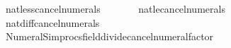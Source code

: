 \begin{isabellebody}
\ \ \ \ \ \ \ \isactrlsimproc {\isasymopen}natless{\isacharunderscore}{\kern0pt}cancel{\isacharunderscore}{\kern0pt}numerals{\isasymclose}{\isacharcomma}{\kern0pt}\isanewline
\ \ \ \ \ \ \ \isactrlsimproc {\isasymopen}natle{\isacharunderscore}{\kern0pt}cancel{\isacharunderscore}{\kern0pt}numerals{\isasymclose}{\isacharcomma}{\kern0pt}\isanewline
\ \ \ \ \ \ \ \isactrlsimproc {\isasymopen}natdiff{\isacharunderscore}{\kern0pt}cancel{\isacharunderscore}{\kern0pt}numerals{\isasymclose}{\isacharcomma}{\kern0pt}\isanewline
\ \ \ \ \ \ \ Numeral{\isacharunderscore}{\kern0pt}Simprocs{\isachardot}{\kern0pt}field{\isacharunderscore}{\kern0pt}divide{\isacharunderscore}{\kern0pt}cancel{\isacharunderscore}{\kern0pt}numeral{\isacharunderscore}{\kern0pt}factor{\isacharbrackright}{\kern0pt}{\isacharparenright}{\kern0pt}\isanewline
{\isacartoucheclose}%
\endisatagML
{\isafoldML}%
%
\isadelimML
\isanewline
%
\endisadelimML
%
\isadelimtheory
\isanewline
%
\endisadelimtheory
%
\isatagtheory
{}\isamarkupfalse%
%
\endisatagtheory
{\isafoldtheory}%
%
\isadelimtheory
%
\endisadelimtheory
%
\end{isabellebody}%
\endinput
